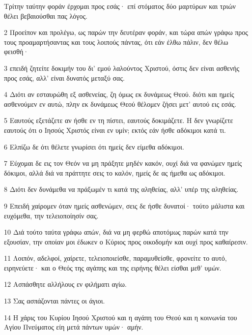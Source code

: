 \par Τρίτην ταύτην φοράν έρχομαι προς εσάς· επί στόματος δύο μαρτύρων και τριών θέλει βεβαιούσθαι πας λόγος.
\par 2 Προείπον και προλέγω, ως παρών την δευτέραν φοράν, και τώρα απών γράφω προς τους προαμαρτήσαντας και τους λοιπούς πάντας, ότι εάν έλθω πάλιν, δεν θέλω φεισθή·
\par 3 επειδή ζητείτε δοκιμήν του δι' εμού λαλούντος Χριστού, όστις δεν είναι ασθενής προς εσάς, αλλ' είναι δυνατός μεταξύ σας.
\par 4 Διότι αν εσταυρώθη εξ ασθενείας, ζη όμως εκ δυνάμεως Θεού. διότι και ημείς ασθενούμεν εν αυτώ, πλην εκ δυνάμεως Θεού θέλομεν ζήσει μετ' αυτού εις εσάς.
\par 5 Εαυτούς εξετάζετε αν ήσθε εν τη πίστει, εαυτούς δοκιμάζετε. Η δεν γνωρίζετε εαυτούς ότι ο Ιησούς Χριστός είναι εν υμίν; εκτός εάν ήσθε αδόκιμοι κατά τι.
\par 6 Ελπίζω δε ότι θέλετε γνωρίσει ότι ημείς δεν είμεθα αδόκιμοι.
\par 7 Εύχομαι δε εις τον Θεόν να μη πράξητε μηδέν κακόν, ουχί διά να φανώμεν ημείς δόκιμοι, αλλά διά να πράττητε σεις το καλόν, ημείς δε ας ήμεθα ως αδόκιμοι.
\par 8 Διότι δεν δυνάμεθα να πράξωμέν τι κατά της αληθείας, αλλ' υπέρ της αληθείας.
\par 9 Επειδή χαίρομεν όταν ημείς ασθενώμεν, σεις δε ήσθε δυνατοί· τούτο μάλιστα και ευχόμεθα, την τελειοποίησίν σας.
\par 10 Διά τούτο ταύτα γράφω απών, διά να μη φερθώ αποτόμως παρών κατά την εξουσίαν, την οποίαν μοι έδωκεν ο Κύριος προς οικοδομήν και ουχί προς καθαίρεσιν.
\par 11 Λοιπόν, αδελφοί, χαίρετε, τελειοποιείσθε, παραμυθείσθε, φρονείτε το αυτό, ειρηνεύετε· και ο Θεός της αγάπης και της ειρήνης θέλει είσθαι μεθ' υμών.
\par 12 Ασπάσθητε αλλήλους εν φιλήματι αγίω.
\par 13 Σας ασπάζονται πάντες οι άγιοι.
\par 14 Η χάρις του Κυρίου Ιησού Χριστού και η αγάπη του Θεού και η κοινωνία του Αγίου Πνεύματος είη μετά πάντων υμών· αμήν.


